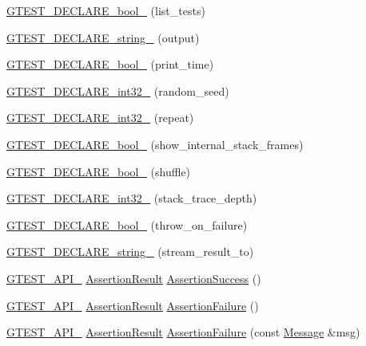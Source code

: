\begin{DoxyCompactItemize}
\item 
\hyperlink{namespacetesting_af2cd3595c571ca408afc337bc4bb2619}{G\+T\+E\+S\+T\+\_\+\+D\+E\+C\+L\+A\+R\+E\+\_\+bool\+\_\+} (list\+\_\+tests)
\item 
\hyperlink{namespacetesting_a3fe54dd551f1c36cfdd1b36cd6881a44}{G\+T\+E\+S\+T\+\_\+\+D\+E\+C\+L\+A\+R\+E\+\_\+string\+\_\+} (output)
\item 
\hyperlink{namespacetesting_aeccefd463a0942da24750e1bbee76041}{G\+T\+E\+S\+T\+\_\+\+D\+E\+C\+L\+A\+R\+E\+\_\+bool\+\_\+} (print\+\_\+time)
\item 
\hyperlink{namespacetesting_ae754999b59509808254d39e3a3cf38e0}{G\+T\+E\+S\+T\+\_\+\+D\+E\+C\+L\+A\+R\+E\+\_\+int32\+\_\+} (random\+\_\+seed)
\item 
\hyperlink{namespacetesting_a315ef0647e4f2795bf1705de8e9c9659}{G\+T\+E\+S\+T\+\_\+\+D\+E\+C\+L\+A\+R\+E\+\_\+int32\+\_\+} (repeat)
\item 
\hyperlink{namespacetesting_af37b9206b938bb8b7d398a1379eb7482}{G\+T\+E\+S\+T\+\_\+\+D\+E\+C\+L\+A\+R\+E\+\_\+bool\+\_\+} (show\+\_\+internal\+\_\+stack\+\_\+frames)
\item 
\hyperlink{namespacetesting_a6d87f7374e105483905a305328856f4b}{G\+T\+E\+S\+T\+\_\+\+D\+E\+C\+L\+A\+R\+E\+\_\+bool\+\_\+} (shuffle)
\item 
\hyperlink{namespacetesting_adba6f8afa0f8695956d0134f1629a10b}{G\+T\+E\+S\+T\+\_\+\+D\+E\+C\+L\+A\+R\+E\+\_\+int32\+\_\+} (stack\+\_\+trace\+\_\+depth)
\item 
\hyperlink{namespacetesting_ac69f2aeeb84dc5f49bd3d040a6f32d17}{G\+T\+E\+S\+T\+\_\+\+D\+E\+C\+L\+A\+R\+E\+\_\+bool\+\_\+} (throw\+\_\+on\+\_\+failure)
\item 
\hyperlink{namespacetesting_ad4d1ea63037fc21018dbe997cb0041d1}{G\+T\+E\+S\+T\+\_\+\+D\+E\+C\+L\+A\+R\+E\+\_\+string\+\_\+} (stream\+\_\+result\+\_\+to)
\item 
\hyperlink{gtest-port_8h_aa73be6f0ba4a7456180a94904ce17790}{G\+T\+E\+S\+T\+\_\+\+A\+P\+I\+\_\+} \hyperlink{classtesting_1_1_assertion_result}{Assertion\+Result} \hyperlink{namespacetesting_ac1d0baedb17286c5c6c87bd1a45da8ac}{Assertion\+Success} ()
\item 
\hyperlink{gtest-port_8h_aa73be6f0ba4a7456180a94904ce17790}{G\+T\+E\+S\+T\+\_\+\+A\+P\+I\+\_\+} \hyperlink{classtesting_1_1_assertion_result}{Assertion\+Result} \hyperlink{namespacetesting_a75cb789614cb1c28c34627a4a3c053df}{Assertion\+Failure} ()
\item 
\hyperlink{gtest-port_8h_aa73be6f0ba4a7456180a94904ce17790}{G\+T\+E\+S\+T\+\_\+\+A\+P\+I\+\_\+} \hyperlink{classtesting_1_1_assertion_result}{Assertion\+Result} \hyperlink{namespacetesting_a6bdf82adf159dcda822d75746937ffa9}{Assertion\+Failure} (const \hyperlink{classtesting_1_1_message}{Message} \&msg)

\end{DoxyCompactItemize}
